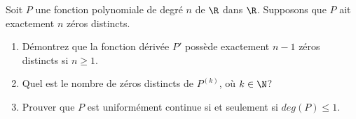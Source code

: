 
\begin{exercice}\label{exo0095}

Soit $P$ une fonction polynomiale de degré $n$ de $\R$ dans $\R$. Supposons que $P$ ait exactement $n$ zéros distincts.
\begin{enumerate}
\item
Démontrez que la fonction dérivée $P'$ possède exactement $n-1$ zéros distincts si $n \geq 1$.
\item
Quel est le nombre de zéros distincts de $P^{(k)}$, où $k\in \N$?
\item
Prouver que $P$ est uniformément continue si et seulement si $deg(P)\leq1$.
\end{enumerate}

\end{exercice}
